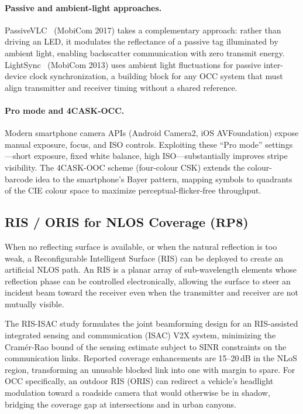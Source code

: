 \documentclass[10pt,a4paper]{article}
\newcommand{\rp}[1]{\textbf{RP#1}}
\begin{document}
\paragraph{Passive and ambient-light approaches.}
PassiveVLC~\cite{passivevlc2017} (MobiCom 2017) takes a complementary
approach: rather than driving an LED, it modulates the reflectance of a
passive tag illuminated by ambient light, enabling backscatter
communication with zero transmit energy. LightSync~\cite{lightsync2013}
(MobiCom 2013) uses ambient light fluctuations for passive inter-device
clock synchronization, a building block for any OCC system that must
align transmitter and receiver timing without a shared reference.

\paragraph{Pro mode and 4CASK-OCC.}
Modern smartphone camera APIs (Android Camera2, iOS AVFoundation) expose
manual exposure, focus, and ISO controls. Exploiting these ``Pro mode''
settings---short exposure, fixed white balance, high ISO---substantially
improves stripe visibility. The 4CASK-OOC scheme (four-colour CSK)
extends the colour-barcode idea to the smartphone's Bayer pattern,
mapping symbols to quadrants of the CIE colour space to maximize
perceptual-flicker-free throughput.

\subsection{RIS / ORIS for NLOS Coverage ($\rp{8}$)}
\label{sec:rp8}

When no reflecting surface is available, or when the natural reflection
is too weak, a Reconfigurable Intelligent Surface (RIS) can be deployed
to create an artificial NLOS path. An RIS is a planar array of
sub-wavelength elements whose reflection phase can be controlled
electronically, allowing the surface to steer an incident beam toward
the receiver even when the transmitter and receiver are not mutually
visible.

The RIS-ISAC study \cite{risisac2025v2x} formulates the joint
beamforming design for an RIS-assisted integrated sensing and
communication (ISAC) V2X system, minimizing the Cram\'er-Rao bound of
the sensing estimate subject to SINR constraints on the communication
links. Reported coverage enhancements are 15--20\,dB in the NLoS region,
transforming an unusable blocked link into one with margin to spare. For
OCC specifically, an outdoor RIS (ORIS) can redirect a vehicle's
headlight modulation toward a roadside camera that would otherwise be in
shadow, bridging the coverage gap at intersections and in urban canyons.
\end{document}

